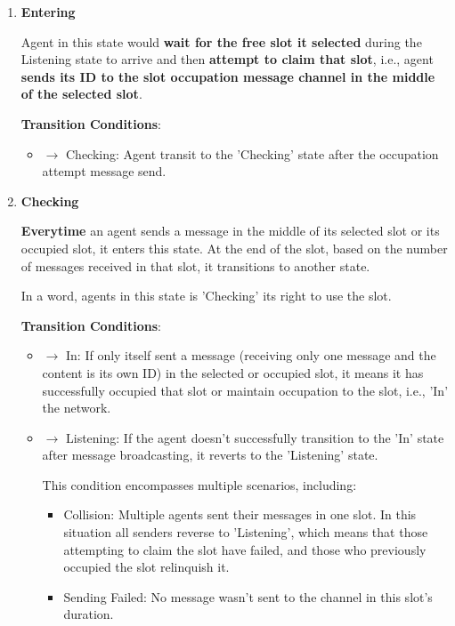 {\begin{enumerate}
    \item \textbf{Entering}
    
    Agent in this state would \textbf{wait for the free slot it selected} during the Listening state to arrive and then \textbf{attempt to claim that slot}, i.e., agent \textbf{sends its ID to the slot occupation message channel in the middle of the selected slot}.

    \textbf{Transition Conditions}:

    \begin{itemize}
        \item $\rightarrow$ Checking: Agent transit to the 'Checking' state after the occupation attempt message send.
    \end{itemize}


    \item \textbf{Checking}
    
    \textbf{Everytime} an agent sends a message in the middle of its selected slot or its occupied slot, it enters this state. At the end of the slot, based on the number of messages received in that slot, it transitions to another state.

    In a word, agents in this state is 'Checking' its right to use the slot.

    \textbf{Transition Conditions}:



    \begin{itemize}
        \item $\rightarrow$ In: If only itself sent a message (receiving only one message and the content is its own ID) in the selected or occupied slot, it means it has successfully occupied that slot or maintain occupation to the slot, i.e., 'In' the network.
        \item $\rightarrow$ Listening: If the agent doesn't successfully transition to the 'In' state after message broadcasting, it reverts to the 'Listening' state. 
        
        This condition encompasses multiple scenarios, including: 
        \begin{itemize}
            \item Collision: Multiple agents sent their messages in one slot. In this situation all senders reverse to 'Listening', which means that those attempting to claim the slot have failed, and those who previously occupied the slot relinquish it.
            \item Sending Failed: No message wasn't sent to the channel in this slot's duration.
        \end{itemize}
    \end{itemize}


\end{enumerate}}
